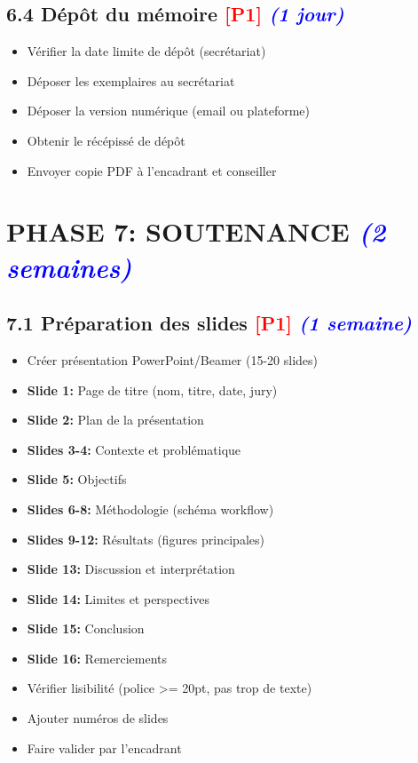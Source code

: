\documentclass[a4paper,11pt]{article}
\newcommand{\checkbox}{\large$\square$}
\newcommand{\priorite}[1]{\textcolor{red}{\textbf{[#1]}}}
\newcommand{\duree}[1]{\textcolor{blue}{\textit{(#1)}}}
\begin{document}
\subsection*{6.4 Dépôt du mémoire \priorite{P1} \duree{1 jour}}

\begin{itemize}[label=\checkbox]
    \item Vérifier la date limite de dépôt (secrétariat)
    \item Déposer les exemplaires au secrétariat
    \item Déposer la version numérique (email ou plateforme)
    \item Obtenir le récépissé de dépôt
    \item Envoyer copie PDF à l'encadrant et conseiller
\end{itemize}

\newpage

\section*{PHASE 7: SOUTENANCE \duree{2 semaines}}

\subsection*{7.1 Préparation des slides \priorite{P1} \duree{1 semaine}}

\begin{itemize}[label=\checkbox]
    \item Créer présentation PowerPoint/Beamer (15-20 slides)
    \item \textbf{Slide 1:} Page de titre (nom, titre, date, jury)
    \item \textbf{Slide 2:} Plan de la présentation
    \item \textbf{Slides 3-4:} Contexte et problématique
    \item \textbf{Slide 5:} Objectifs
    \item \textbf{Slides 6-8:} Méthodologie (schéma workflow)
    \item \textbf{Slides 9-12:} Résultats (figures principales)
    \item \textbf{Slide 13:} Discussion et interprétation
    \item \textbf{Slide 14:} Limites et perspectives
    \item \textbf{Slide 15:} Conclusion
    \item \textbf{Slide 16:} Remerciements
    \item Vérifier lisibilité (police >= 20pt, pas trop de texte)
    \item Ajouter numéros de slides
    \item Faire valider par l'encadrant
\end{itemize}
\end{document}
